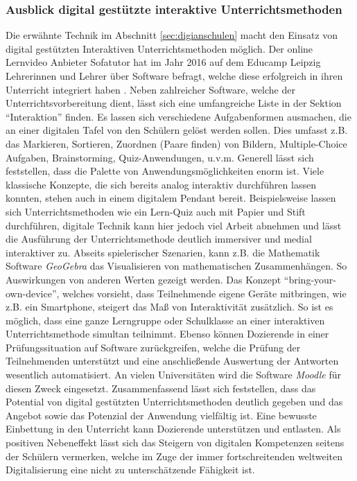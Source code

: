 \subsubsection{Ausblick digital gestützte interaktive Unterrichtsmethoden}\label{sec:interaktiveunterr}
Die erwähnte Technik im Abschnitt \ref{sec:digianschulen} macht den Einsatz von digital gestützten Interaktiven Unterrichtsmethoden möglich. Der online Lernvideo Anbieter Sofatutor hat im Jahr 2016 auf dem Educamp Leipzig Lehrerinnen und Lehrer über Software befragt, welche diese erfolgreich in ihren Unterricht integriert haben \cite{Sofatutor2019}. Neben zahlreicher Software, welche der Unterrichtsvorbereitung dient, lässt sich eine umfangreiche Liste in der Sektion "`Interaktion"' finden. Es lassen sich verschiedene Aufgabenformen ausmachen, die an einer digitalen Tafel von den Schülern gelöst werden sollen. Dies umfasst z.B. das Markieren, Sortieren, Zuordnen (Paare finden) von Bildern, Multiple-Choice Aufgaben, Brainstorming, Quiz-Anwendungen, u.v.m. Generell lässt sich feststellen, dass die Palette von Anwendungsmöglichkeiten enorm ist. Viele klassische Konzepte, die sich bereits analog interaktiv durchführen lassen konnten, stehen auch in einem digitalem Pendant bereit. Beispielsweise lassen sich Unterrichtsmethoden wie ein Lern-Quiz auch mit Papier und Stift durchführen, digitale Technik kann hier jedoch viel Arbeit abnehmen und lässt die Ausführung der Unterrichtsmethode deutlich immersiver und medial interaktiver zu. Abseits spielerischer Szenarien, kann z.B. die Mathematik Software \emph{GeoGebra} das Visualisieren von mathematischen Zusammenhängen. So Auswirkungen von anderen Werten gezeigt werden. Das Konzept "`bring-your-own-device"', welches vorsieht, dass Teilnehmende eigene Geräte mitbringen, wie z.B. ein Smartphone, steigert das Maß von Interaktivität zusätzlich. So ist es möglich, dass eine ganze Lerngruppe oder Schulklasse  an einer interaktiven Unterrichtsmethode simultan teilnimmt. Ebenso können Dozierende in einer Prüfungssituation auf Software zurückgreifen, welche die Prüfung der Teilnehmenden unterstützt und eine anschließende Auswertung der Antworten wesentlich automatisiert. An vielen Universitäten wird die Software \emph{Moodle} für diesen Zweck eingesetzt.  Zusammenfassend lässt sich feststellen, dass das Potential von digital gestützten Unterrichtsmethoden deutlich gegeben und das Angebot sowie das Potenzial der Anwendung vielfältig ist. Eine bewusste Einbettung in den Unterricht kann Dozierende unterstützen und entlasten. Als positiven Nebeneffekt lässt sich das Steigern von digitalen Kompetenzen seitens der Schülern vermerken, welche im Zuge der immer fortschreitenden weltweiten Digitalisierung eine nicht zu unterschätzende Fähigkeit ist. 
\newpage
